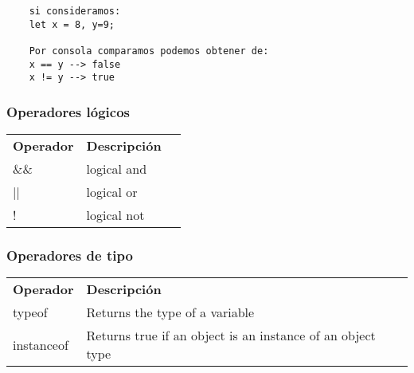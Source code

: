 \begin{verbatim}
    si consideramos: 
    let x = 8, y=9;
    
    Por consola comparamos podemos obtener de: 
    x == y --> false
    x != y --> true
\end{verbatim}

\subsubsection{Operadores l\'ogicos}
\begin{flushleft}
    \begin{spacing}{1.7}
        \begin{tabular}{p{4cm} ll}
         \textbf{Operador} & \textbf{Descripci\'on}  \\ %
         \&\&              &	logical and   \\
         ||                &	logical or    \\
         !                 &	logical not   \\
        \end{tabular}
    \end{spacing}
\end{flushleft}

\subsubsection{Operadores de tipo}
\begin{flushleft}
    \begin{spacing}{1.7}
        \begin{tabular}{p{4cm} ll}
        \textbf{Operador} & \textbf{Descripci\'on}  \\ %
        typeof            & 	Returns the type of a variable \\
        instanceof        & 	Returns true if an object is an instance of an object type \\
        \end{tabular}
    \end{spacing}
\end{flushleft}


